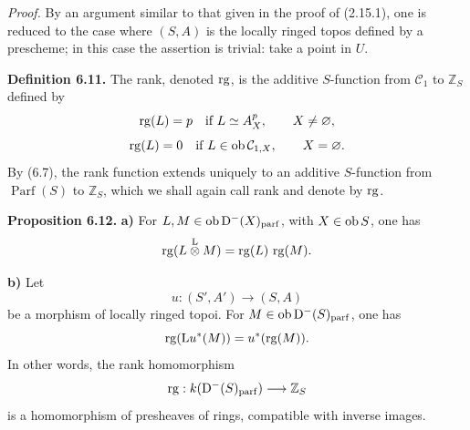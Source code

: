 \documentclass[11pt]{article}
\newcommand{\cl}{\operatorname{cl}}
\newcommand{\Parf}{\operatorname{Parf}}
\newcommand{\Tor}{\operatorname{Tor}}
\providecommand{\cC}{\mathcal C}
\providecommand{\Tor}{\operatorname{Tor}}
\providecommand{\Ker}{\operatorname{Ker}}
\begin{document}
\emph{Proof.} By an argument similar to that given in the proof of (2.15.1), one is reduced to the case where \((S,A)\) is the locally ringed topos defined by a prescheme; in this case the assertion is trivial: take a point in \(U\).

\textbf{Definition 6.11.} The rank, denoted \(\rg\), is the additive \(S\)-function from \(\mathcal C_1\) to \(\mathbb Z_S\) defined by
\[
  \rg(L)=p\quad\text{if } L\simeq A_X^p,
  \qquad X\ne\varnothing,
\]
\[
  \rg(L)=0\quad\text{if } L\in\Ob\mathcal C_{1,X},
  \qquad X=\varnothing.
\]
By (6.7), the rank function extends uniquely to an additive \(S\)-function from \(\Parf(S)\) to \(\mathbb Z_S\), which we shall again call rank and denote by \(\rg\).

\textbf{Proposition 6.12.} \textbf{a)} For \(L,M\in\Ob\Dpx^-(X)_{\mathrm{parf}}\), with \(X\in\Ob S\), one has
\[
  \rg(L\overset{\mathrm L}{\otimes} M)=\rg(L)\,\rg(M).
\]

\textbf{b)} Let
\[
  u:(S',A')\longrightarrow(S,A)
\]
be a morphism of locally ringed topoi. For \(M\in\Ob\Dpx^-(S)_{\mathrm{parf}}\), one has
\[
  \rg(\mathrm L u^*(M))=u^*(\rg(M)).
\]
In other words, the rank homomorphism
\[
  \rg:k(\Dpx^-(S)_{\mathrm{parf}})\longrightarrow \mathbb Z_S
\]
is a homomorphism of presheaves of rings, compatible with inverse images.



\providecommand{\Cpx}{\mathrm C}
\providecommand{\Kpx}{\mathrm K}
\providecommand{\Dpx}{\mathrm D}
\providecommand{\Ho}{\mathrm H}
\providecommand{\Ob}{\operatorname{ob}}
\providecommand{\Hom}{\operatorname{Hom}}
\providecommand{\RHom}{\mathrm R\!\operatorname{Hom}}
\providecommand{\Ext}{\operatorname{Ext}}
\providecommand{\Tor}{\operatorname{Tor}}
\providecommand{\Tr}{\operatorname{Tr}}
\providecommand{\Add}{\operatorname{Add}}
\providecommand{\Cart}{\operatorname{Cart}}
\providecommand{\Parf}{\operatorname{Parf}}
\providecommand{\coh}{\operatorname{coh}}
\providecommand{\amp}{\operatorname{amp}}
\providecommand{\cl}{\operatorname{cl}}
\providecommand{\rg}{\operatorname{rg}}
\providecommand{\Id}{\operatorname{Id}}
\providecommand{\Ker}{\operatorname{Ker}}
\providecommand{\Im}{\operatorname{Im}}
\providecommand{\cH}{\mathcal H}
\providecommand{\Zs}{\mathbb Z_S}
\providecommand{\A}{\mathcal A}
\providecommand{\cC}{\mathcal C}
\providecommand{\cCzero}{\mathcal C_0}
\providecommand{\otL}{\mathop{\otimes}^{\mathrm L}}
\providecommand{\tamp}{\operatorname{tor.amp}}
\providecommand{\pamp}{\operatorname{parf.amp}}
\providecommand{\pdim}{\operatorname{parf.dim}}
\providecommand{\bon}{\mathrm b}
\providecommand{\parf}{\operatorname{parf}}
\providecommand{\parff}{\operatorname{parf}}
\providecommand{\ac}{\mathrm{ac}}
\end{document}
